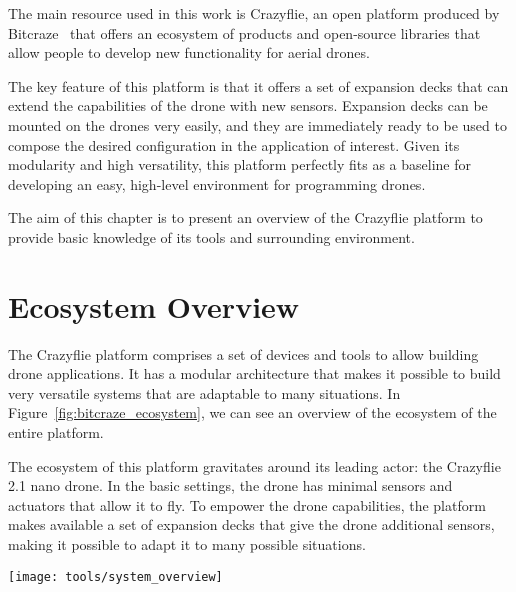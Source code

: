 The main resource used in this work is Crazyflie, an open platform produced by Bitcraze~\cite{bitcraze} 
that offers an ecosystem of products and open-source libraries that allow people to develop new functionality for aerial drones. 

The key feature of this platform is that it offers a set of expansion decks that can extend the capabilities of the drone with new sensors. 
Expansion decks can be mounted on the drones very easily, and they are immediately ready to be used to compose the desired configuration in the application of interest.
Given its modularity and high versatility, this platform perfectly fits as a baseline for developing an easy, high-level environment for programming drones. 

The aim of this chapter is to present an overview of the Crazyflie platform to provide basic knowledge of its tools and surrounding environment.


\section{Ecosystem Overview}\label{sec:ecosystem_oveerview}
The Crazyflie platform comprises a set of devices and tools to allow building drone applications. 
It has a modular architecture that makes it possible to build very versatile systems that are adaptable to many situations. 
In Figure~\ref{fig:bitcraze_ecosystem}, we can see an overview of the ecosystem of the entire platform.

The ecosystem of this platform gravitates around its leading actor: the Crazyflie 2.1 nano drone. 
In the basic settings, the drone has minimal sensors and actuators that allow it to fly. 
To empower the drone capabilities, the platform makes available a set of expansion decks that give the drone additional sensors, making it possible to adapt it to many possible situations.


\begin{SCfigure}[\sidecaptionrelwidth][h]
    \texttt{[image: tools/system\_overview]}
    \caption[Bitcraze Ecosystem overview]{This picture represents an overview of the Bitcraze Ecosystem~\cite{bitcraze}}
    \label{fig:bitcraze_ecosystem}
\end{SCfigure}


